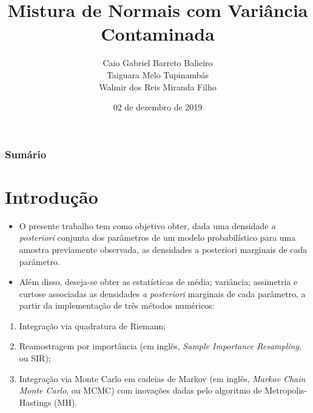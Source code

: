 \documentclass[9pt]{beamer}
\title[Mistura de Normais com Variância Contaminada]{Mistura de Normais com Variância Contaminada}
\author[Caio, Taiguara e Walmir]{\normalsize Caio Gabriel Barreto Balieiro\\ Taiguara Melo Tupinambás\\ Walmir dos Reis Miranda Filho}
\institute[]{\normalsize Programa de Pós-Graduação em Estatística\\ Departamento de Estatística - UFMG }
\date[06/12/2019]{02 de dezembro de 2019}
\begin{document}
\begin{frame}[plain]
\titlepage
\end{frame}

\begin{frame}[plain]
\frametitle{Sumário}
\tableofcontents
\end{frame}
\section{Introdução}
\begin{frame}
\begin{itemize}
\justifying
\item O presente trabalho tem como objetivo obter, dada uma densidade \textit{a posteriori} conjunta dos parâmetros de um modelo probabilístico para uma amostra previamente observada, as densidades a posteriori marginais de cada parâmetro.

\item Além disso, deseja-se obter as estatísticas de média; variância; assimetria e curtose associadas as densidades \textit{a posteriori} marginais de cada parâmetro, a partir da implementação de três métodos numéricos:
\end{itemize}
\begin{enumerate}
\justifying
\item Integração via quadratura de Riemann;
\item Reamostragem por importância (em inglês, \textit{Sample Importance Resampling}, ou SIR);
\item Integração via Monte Carlo em cadeias de Markov (em inglês, \textit{Markov Chain Monte Carlo}, ou MCMC) com inovações dadas pelo algoritmo de Metropolis-Hastings (MH).
\end{enumerate}
\end{frame}
\end{document}
